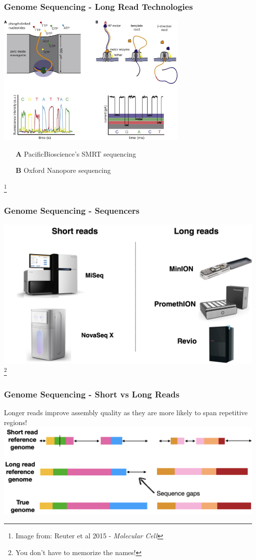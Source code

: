 \documentclass{beamer}
\newcommand\blfootnote[1]{%
	\begingroup
	\renewcommand\thefootnote{}\footnote{#1}%
	\addtocounter{footnote}{-1}%
	\endgroup
}
\begin{document}
\begin{frame}
	\frametitle{Genome Sequencing - Long Read Technologies}
\centering \includegraphics[width=0.7\textwidth]{img/pacBioNanopore}
\begin{itemize}
	\item[\textbf{A}] PacificBioscience's SMRT sequencing
	\item[\textbf{B}] Oxford Nanopore sequencing
\end{itemize}
\blfootnote{Image from: Reuter et al 2015 - \textit{Molecular Cell}}
\end{frame}


\begin{frame}
	\frametitle{Genome Sequencing - Sequencers}
\centering \includegraphics[width=\textwidth]{img/sequencers}
\blfootnote{You don't have to memorize the names!}
\end{frame}


\begin{frame}
	\frametitle{Genome Sequencing - Short vs Long Reads}

		Longer reads improve assembly quality as they are more likely to span repetitive regions!\\
		\vspace{10pt}
		\includegraphics[width=\textwidth]{img/referenceGenomeComparison}
		\pause
\end{frame}
\end{document}
